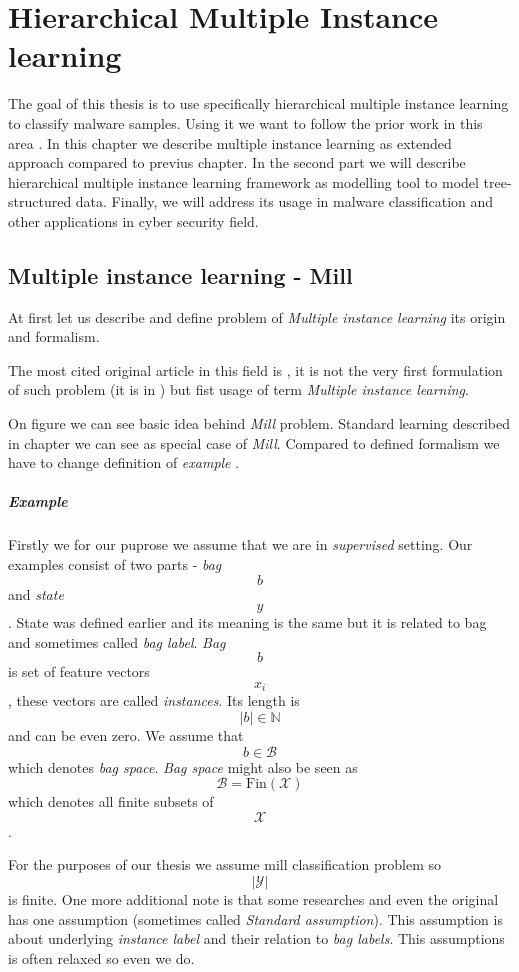\chapter{Hierarchical Multiple Instance learning}
The goal of this thesis is to use specifically hierarchical multiple instance learning to classify malware samples. Using it we want to follow the prior work in this area \cite{Mandlik2020}.
In this chapter we describe multiple instance learning as extended approach compared to previus chapter. In the second part we will describe hierarchical multiple instance learning framework as modelling tool to model tree-structured data. Finally, we will address its usage in malware classification and other applications in cyber security field.

\section{Multiple instance learning - Mill}
At first let us describe and define problem of \emph{Multiple instance learning} its origin and formalism.

The most cited original article in this field is \citet{Dietterich1997}, it is not the very first formulation of such problem (it is in \cite{Keeler1991}) but fist usage of term \emph{Multiple instance learning}.

On figure  we can see basic idea behind \emph{Mill} problem. Standard learning described in chapter  we can see as special case of \emph{Mill}. Compared to defined formalism we have to change definition of \emph{example} . 
\paragraph{Example}
Firstly we for our puprose we assume that we are in \emph{supervised} setting. Our examples consist of two parts - \emph{bag} $$b$$ and \emph{state} $$y$$. State was defined earlier and its meaning is the same but it is related to bag and sometimes called \emph{bag label}. \emph{Bag} $$b$$ is set of feature vectors $$x_i$$, these vectors are called \emph{instances}. Its length is $$|b| \in \mathbb{N}$$ and can be even zero. We assume that $$b \in \mathcal{B}$$ which denotes \emph{bag space}. \emph{Bag space} might also be seen as $$\mathcal{B} = \mathrm{Fin}(\mathcal{X})$$ which denotes all finite subsets of $$\mathcal{X}$$.

For the purposes of our thesis we assume mill classification problem so $$|\mathcal{Y}|$$ is finite. One more additional note is that some researches and even the original has one assumption (sometimes called \emph{Standard assumption}). This assumption is about underlying \emph{instance label} and their relation to \emph{bag labels}. This assumptions is often relaxed \cite{Xu2003} so even we do.

